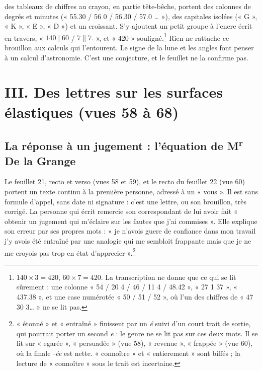 \documentclass[11pt,a4paper]{article}
\begin{document}
des tableaux de chiffres au crayon, en partie tête-bêche, portent des
colonnes de degrés et minutes (« 55.30 / 56 0 / 56.30 / 57.0 … »), des
capitales isolées (« G », « K », « E », « D ») et un croissant. S'y ajoutent un
petit groupe à l'encre écrit en travers, « \(140\mid60\) / \(7\parallel7.\) »,
et « 420 » souligné.\footnote{\(140\times3=420\), \(60\times7=420\). La
transcription ne donne que ce qui se lit sûrement : une colonne
« 54 / 20 4 / 46 / 11 4 / 48.42 », « 27 1 37 », « 437.38 », et une case
numérotée « 50 / 51 / 52 », où l'un des chiffres de « 47 30 3\ldots{} » ne se
lit pas.} Rien ne rattache ce brouillon aux calculs qui l'entourent. Le signe
de la lune et les angles font penser à un calcul d'astronomie. C'est une
conjecture, et le feuillet ne la confirme pas.

\section*{III. Des lettres sur les surfaces élastiques (vues 58 à 68)}

\subsection*{La réponse à un jugement : l'équation de M\textsuperscript{r} De la Grange}

Le feuillet 21, recto et verso (vues 58 et 59), et le recto du feuillet 22
(vue 60) portent un texte continu à la première personne, adressé à un
« vous ». Il est sans formule d'appel, sans date ni signature : c'est une
lettre, ou son brouillon, très corrigé. La personne qui écrit remercie son
correspondant de lui avoir fait « obtenir un jugement qui m'éclaire sur les
fautes que j'ai commises ». Elle explique son erreur par ses propres mots :
« je n'avois guere de confiance dans mon travail j'y avois été entraîné par une
analogie qui me sembloit frappante mais que je ne me croyois pas trop en état
d'apprecier ».\footnote{« étonné » et « entraîné » finissent par un \emph{é}
suivi d'un court trait de sortie, qui pourrait porter un second \emph{e} :
le genre ne se lit pas sur ces deux mots. Il se lit sur « egarée »,
« persuadée » (vue 58), « revenue », « frappée » (vue 60), où la finale
\emph{-ée} est nette. « connoître » et « entierement » sont biffés ; la
lecture de « connoître » sous le trait est incertaine.}
\end{document}
